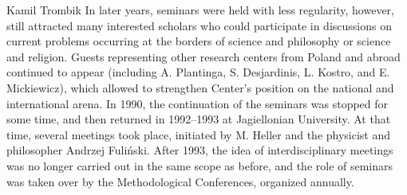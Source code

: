 \begin{artengenv}{Kamil Trombik}
In later years, seminars were held with less regularity, however, still attracted many interested scholars who could
participate in discussions on current problems occurring at the borders of science and philosophy or science and
religion. Guests representing other research centers from Poland and abroad continued to appear (including A.
Plantinga, S. Desjardinis, L. Kostro, and E. Mickiewicz), which allowed to strengthen Center's position on the national
and international arena. In 1990, the continuation of the seminars was stopped for some time, and then returned in
1992--1993 at Jagiellonian University. At that time, several meetings took place, initiated by M. Heller and the
physicist and philosopher Andrzej Fuliński. After 1993, the idea of interdisciplinary meetings was no longer carried
out in the same scope as before, and the role of seminars was taken over by the Methodological Conferences, organized
annually.


\end{artengenv}
